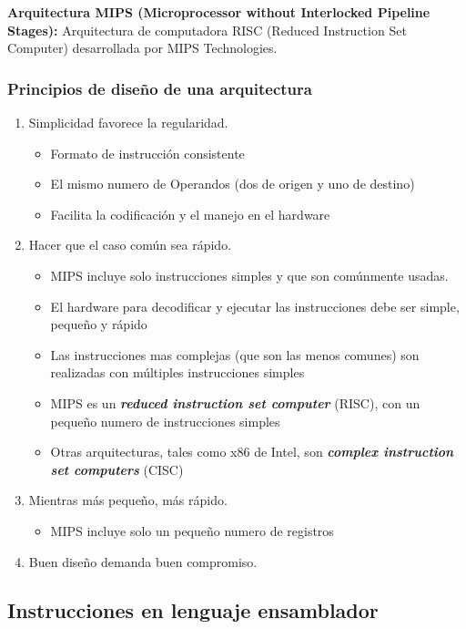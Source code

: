 \documentclass{templateNote}
\begin{document}
\noindent \textbf{Arquitectura MIPS (Microprocessor without Interlocked Pipeline Stages):} Arquitectura de computadora RISC (Reduced Instruction Set Computer) desarrollada por MIPS Technologies.

\subsubsection{Principios de diseño de una arquitectura}
\begin{enumerate}
    \item Simplicidad favorece la regularidad.
    \begin{itemize}
        \item Formato de instrucción consistente
        \item El mismo numero de Operandos (dos de origen y uno de destino)
        \item Facilita la codificación y el manejo en el hardware
    \end{itemize}
    \item Hacer que el caso común sea rápido.
    \begin{itemize}
        \item MIPS incluye solo instrucciones simples y que son comúnmente usadas.
        \item El hardware para decodificar y ejecutar las instrucciones debe ser simple, pequeño y rápido
        \item Las instrucciones mas complejas (que son las menos comunes) son realizadas con múltiples instrucciones simples
        \item MIPS es un \textit{\textbf{reduced instruction set computer}} (RISC), con un pequeño numero de instrucciones simples
        \item Otras arquitecturas, tales como x86 de Intel, son \textit{\textbf{complex instruction set computers}} (CISC)
    \end{itemize}
    \item Mientras más pequeño, más rápido.
    \begin{itemize}
        \item MIPS incluye solo un pequeño numero de registros
    \end{itemize}
    \item Buen diseño demanda buen compromiso.
\end{enumerate}

\subsection{Instrucciones en lenguaje ensamblador}
\end{document}
